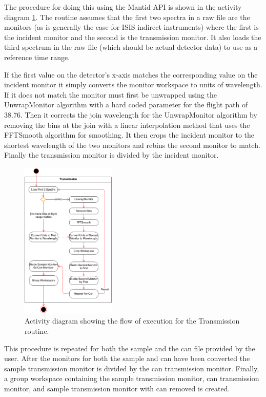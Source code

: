 \documentclass[paper=a4, fontsize=11pt]{scrartcl}	%
\numberwithin{equation}{section}															%
\numberwithin{figure}{section}																%
\numberwithin{table}{section}																%
\begin{document}
The procedure for doing this using the Mantid API is shown in the activity diagram \ref{fig:c2e-transmission-activity-diagram}. The routine assumes that the first two spectra in a raw file are the monitors (as is generally the case for ISIS indirect instruments) where the first is the incident monitor and the second is the transmission monitor. It also loads the third spectrum in the raw file (which should be actual detector data) to use as a reference time range. 

If the first value on the detector's x-axis matches the corresponding value on the incident monitor it simply converts the monitor workspace to units of wavelength. If it does not match the monitor must first be unwrapped using the UnwrapMonitor algorithm with a hard coded parameter for the flight path of 38.76. Then it corrects the join wavelength for the UnwrapMonitor algorithm by removing the bins at the join with a linear interpolation method that uses the FFTSmooth algorithm for smoothing. It then crops the incident monitor to the shortest wavelength of the two monitors and rebins the second monitor to match. Finally the transmission monitor is divided by the incident monitor.

\begin{figure}[H]
\centering
\includegraphics[width=0.4\textwidth]{img/uml/activity_diagrams/Transmission_activity.png}
\caption{Activity diagram showing the flow of execution for the Transmission routine.}
\label{fig:c2e-transmission-activity-diagram}
\end{figure}

This procedure is repeated for both the sample and the can file provided by the user. After the monitors for both the sample and can have been converted the sample transmission monitor is divided by the can transmission monitor. Finally, a group workspace containing the sample transmission monitor, can transmission monitor, and sample transmission monitor with can removed is created.
\end{document}
